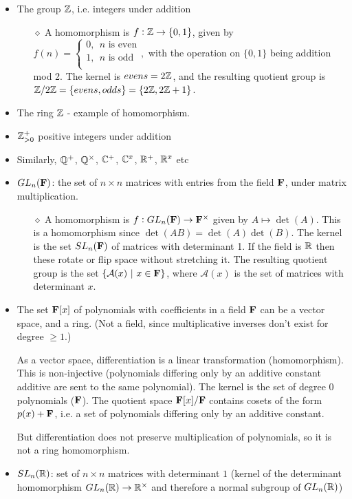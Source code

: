 \begin{itemize}
\item The group $\mathbb{Z}$, i.e. integers under addition
  \begin{itemize}
  \item[$\diamond$] A homomorphism is $f:\mathbb{Z} \to \{0, 1\}$, given by $f(n) =
    \begin{cases}
      0, ~~\text{$n$ is even}\\
      1, ~~\text{$n$ is odd}\\
    \end{cases},$ with the operation on $\{0, 1\}$ being addition mod 2. The kernel is
    $evens = 2\mathbb{Z}$, and the resulting quotient group is
    $\mathbb{Z}/2\mathbb{Z} = \{evens, odds\} = \{2\mathbb{Z}, 2\mathbb{Z} + 1\}$.
  \end{itemize}

\item The ring $\mathbb{Z}$ - example of homomorphism.
\item $\mathbb{Z}_{>0}^+$ positive integers under addition

\item Similarly, $\mathbb{Q}^+$, $\mathbb{Q}^\times$, $\mathbb{C}^+$, $\mathbb{C}^x$, $\mathbb{R}^+$, $\mathbb{R}^x$ etc

\item $GL_n(\mathbf{F})$: the set of $n \times n$ matrices with entries from the field $\mathbf{F}$, under matrix
  multiplication.
  \begin{itemize}
  \item[$\diamond$] A homomorphism is $f:GL_n(\mathbf{F}) \to \mathbf{F}^\times$ given by $A \mapsto \det(A)$. This
    is a homomorphism since $\det(AB) = \det(A) \det(B)$. The kernel is the set $SL_n(\mathbf{F})$ of
    matrices with determinant 1. If the field is $\mathbb{R}$ then these rotate or flip space without
    stretching it. The resulting quotient group is the set $\{\mathcal{A}(x) ~|~ x \in \mathbf{F}\}$, where
    $\mathcal{A}(x)$ is the set of matrices with determinant $x$.
  \end{itemize}

\item The set $\mathbf{F}[x]$ of polynomials with coefficients in a field $\mathbf{F}$ can be a vector space, and a
  ring. (Not a field, since multiplicative inverses don't exist for degree $\geq 1$.)

  As a vector space, differentiation is a linear transformation (homomorphism). This is
  non-injective (polynomials differing only by an additive constant additive are sent to the same
  polynomial). The kernel is the set of degree 0 polynomials ($\mathbf{F}$). The quotient space $\mathbf{F}[x]/\mathbf{F}$
  contains cosets of the form $p(x) + \mathbf{F}$, i.e. a set of polynomials differing only by an additive
  constant.

  But differentiation does not preserve multiplication of polynomials, so it is not a ring
  homomorphism.

\item $SL_n(\mathbb{R})$: set of $n \times n$ matrices with determinant $1$ (kernel of the
  determinant homomorphism $GL_n(\mathbb{R}) \rightarrow \mathbb{R}^\times$ and therefore a normal
  subgroup of $GL_n(\mathbb{R})$)
\end{itemize}


